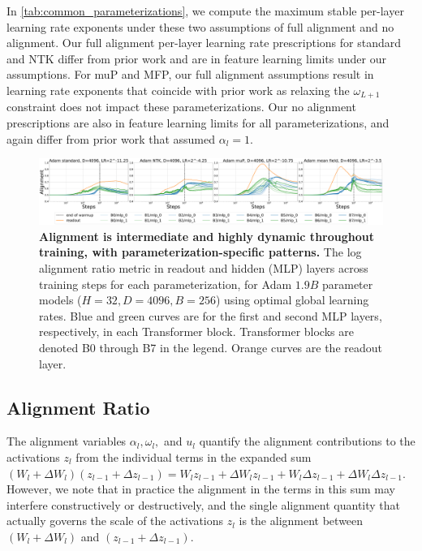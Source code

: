 \documentclass{article}
\theoremstyle{plain}
\theoremstyle{definition}
\theoremstyle{remark}
\begin{document}
In \cref{tab:common_parameterizations}, we compute the maximum stable per-layer learning rate exponents under these two assumptions of full alignment and no alignment. Our full alignment per-layer learning rate prescriptions for standard and NTK differ from prior work and are in feature learning limits under our assumptions. For muP and MFP, our full alignment assumptions result in learning rate exponents that coincide with prior work as relaxing the $\omega_{L+1}$ constraint does not impact these parameterizations. Our no alignment prescriptions are also in feature learning limits for all parameterizations, and again differ from prior work that assumed $\alpha_l = 1$.














\begin{figure}[ht!]
    \centering
    \includegraphics[clip=true,trim={6 15 6 8},width=\textwidth]{icml2024/figures/alignment/alignment_main_adam.pdf}
    \caption{\textbf{Alignment is intermediate and highly dynamic throughout training, with parameterization-specific patterns.} The log alignment ratio metric in readout and hidden (MLP) layers across training steps for each parameterization, for Adam $1.9B$ parameter models ($H=32, D=4096, B=256$) using optimal global learning rates. Blue and green curves are for the first and second MLP layers, respectively, in each Transformer block. Transformer blocks are denoted B0 through B7 in the legend. Orange curves are the readout layer.}
    \vspace{-8pt}
    \label{fig:alignment}
\end{figure}

\subsection{Alignment Ratio}
 The alignment variables $\alpha_l, \omega_l,$ and $u_l$ quantify the alignment contributions to the activations $z_l$ from the individual terms in the expanded sum $(W_l + \Delta W_l)(z_{l-1} + \Delta z_{l-1}) = W_lz_{l-1} + \Delta W_lz_{l-1} + W_l\Delta z_{l-1} + \Delta W_l\Delta z_{l-1}$. However, we note that in practice the alignment in the terms in this sum may interfere constructively or destructively, and the single alignment quantity that actually governs the scale of the activations $z_l$ is the alignment between $(W_l + \Delta W_l)$ and $(z_{l-1} + \Delta z_{l-1})$.
 
\end{document}
